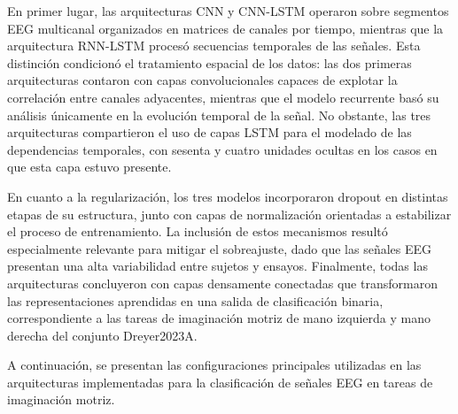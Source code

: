 En primer lugar, las arquitecturas CNN y CNN-LSTM operaron sobre segmentos EEG multicanal organizados en matrices de canales por tiempo, mientras que la arquitectura RNN-LSTM procesó secuencias temporales de las señales. Esta distinción condicionó el tratamiento espacial de los datos: las dos primeras arquitecturas contaron con capas convolucionales capaces de explotar la correlación entre canales adyacentes, mientras que el modelo recurrente basó su análisis únicamente en la evolución temporal de la señal. No obstante, las tres arquitecturas compartieron el uso de capas LSTM para el modelado de las dependencias temporales, con sesenta y cuatro unidades ocultas en los casos en que esta capa estuvo presente.

En cuanto a la regularización, los tres modelos incorporaron dropout en distintas etapas de su estructura, junto con capas de normalización orientadas a estabilizar el proceso de entrenamiento. La inclusión de estos mecanismos resultó especialmente relevante para mitigar el sobreajuste, dado que las señales EEG presentan una alta variabilidad entre sujetos y ensayos. Finalmente, todas las arquitecturas concluyeron con capas densamente conectadas que transformaron las representaciones aprendidas en una salida de clasificación binaria, correspondiente a las tareas de imaginación motriz de mano izquierda y mano derecha del conjunto Dreyer2023A.

A continuación, se presentan las configuraciones principales utilizadas en las arquitecturas implementadas para la clasificación de señales EEG en tareas de imaginación motriz.


